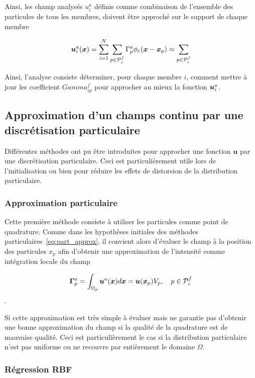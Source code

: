Ainsi, les champ analysés $u_i^a$ définis comme combinaison de l'ensemble des particules de tous les membres, doivent être approché sur le support de chaque membre

\begin{eqnarray*}
    \bm{u}_i^a(\bm{x}) =  \sum_{i=1}^{N} \sum_{p \in \mathcal{P}_j^f} \Gamma^a_p \phi_{\varepsilon}(\bm{x} - \bm{x}_p)\approx \sum _{p \in \mathcal{P}_i^f}
\end{eqnarray*}

Ainsi, l'analyse consiste déterminer, pour chaque membre $i$, comment mettre à jour les coefficient $Gamma^f_{ip}$ pour approcher au mieux la fonction $\bm{u}_i^a$.

\subsection{Approximation d'un champs continu par une discrétisation particulaire}

Différentes méthodes ont pu être introduites pour approcher une fonction $\bm u$ par une discrétisation particulaire. Ceci est particulièrement utile lors de l'initialisation ou bien pour réduire les effets de distorsion de la distribution particulaire.

\subsubsection{Approximation particulaire}

Cette première méthode consiste à utiliser les particules comme point de quadrature. Comme dans les hypothèses initiales des méthodes particulaires~\eqref{eq:part_approx}, il convient alors d'évaluer le champ à la position des particules $x_p$ afin d'obtenir une approximation de l'intensité comme intégration locale du champ

\begin{equation*}
    \bm \Gamma^a_p = \int_{\Omega_p} \bm u^a(\bm{x}) d\bm{x} = \bm u(\bm{x}_p) V_p, \quad p \in \mathcal P^f_i
\end{equation*}.

Si cette approximation est très simple à évaluer mais ne garantie pas d'obtenir une bonne approximation du champ si la qualité de la quadrature est de mauvaise qualité. Ceci est particulièrement le cas si la distribution particulaire n'est pas uniforme ou ne recouvre par entièrement le domaine $\Omega$.

\subsubsection{Régression RBF}

